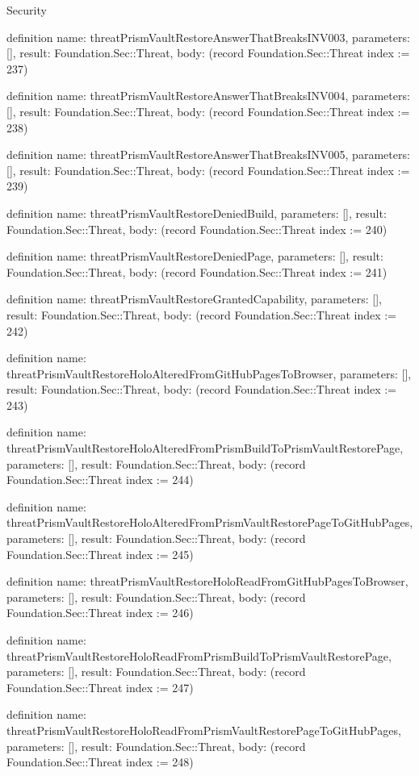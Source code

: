 \begin{lexlean}{Security}
\begin{semanticmodule}
definition{
  name: threatPrismVaultRestoreAnswerThatBreaksINV003,
  parameters: [],
  result: Foundation.Sec::Threat,
  body: (record Foundation.Sec::Threat {index := 237})
}

definition{
  name: threatPrismVaultRestoreAnswerThatBreaksINV004,
  parameters: [],
  result: Foundation.Sec::Threat,
  body: (record Foundation.Sec::Threat {index := 238})
}

definition{
  name: threatPrismVaultRestoreAnswerThatBreaksINV005,
  parameters: [],
  result: Foundation.Sec::Threat,
  body: (record Foundation.Sec::Threat {index := 239})
}

definition{
  name: threatPrismVaultRestoreDeniedBuild,
  parameters: [],
  result: Foundation.Sec::Threat,
  body: (record Foundation.Sec::Threat {index := 240})
}

definition{
  name: threatPrismVaultRestoreDeniedPage,
  parameters: [],
  result: Foundation.Sec::Threat,
  body: (record Foundation.Sec::Threat {index := 241})
}

definition{
  name: threatPrismVaultRestoreGrantedCapability,
  parameters: [],
  result: Foundation.Sec::Threat,
  body: (record Foundation.Sec::Threat {index := 242})
}

definition{
  name: threatPrismVaultRestoreHoloAlteredFromGitHubPagesToBrowser,
  parameters: [],
  result: Foundation.Sec::Threat,
  body: (record Foundation.Sec::Threat {index := 243})
}

definition{
  name: threatPrismVaultRestoreHoloAlteredFromPrismBuildToPrismVaultRestorePage,
  parameters: [],
  result: Foundation.Sec::Threat,
  body: (record Foundation.Sec::Threat {index := 244})
}

definition{
  name: threatPrismVaultRestoreHoloAlteredFromPrismVaultRestorePageToGitHubPages,
  parameters: [],
  result: Foundation.Sec::Threat,
  body: (record Foundation.Sec::Threat {index := 245})
}

definition{
  name: threatPrismVaultRestoreHoloReadFromGitHubPagesToBrowser,
  parameters: [],
  result: Foundation.Sec::Threat,
  body: (record Foundation.Sec::Threat {index := 246})
}

definition{
  name: threatPrismVaultRestoreHoloReadFromPrismBuildToPrismVaultRestorePage,
  parameters: [],
  result: Foundation.Sec::Threat,
  body: (record Foundation.Sec::Threat {index := 247})
}

definition{
  name: threatPrismVaultRestoreHoloReadFromPrismVaultRestorePageToGitHubPages,
  parameters: [],
  result: Foundation.Sec::Threat,
  body: (record Foundation.Sec::Threat {index := 248})
}


\end{semanticmodule}
\end{lexlean}
